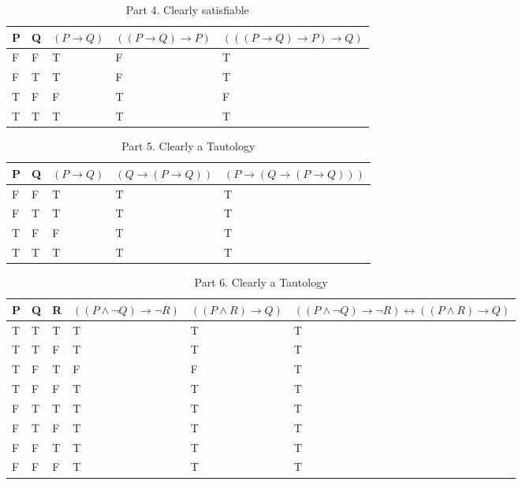 \documentclass[10.5pt]{article}
\newenvironment{solution}[2][Solution]{ \begin{trivlist}
\item[\hskip \labelsep {\bfseries #1}]}{\end{trivlist}}
\begin{document}
\begin{solution}{2}
\begin{table}[!h]
\centering
\caption{Part 4. Clearly satisfiable}
\label{my-label}
\begin{tabular}{|l|l|l|l|l|}
\hline
P & Q & $(P \rightarrow Q)$ & $((P \rightarrow Q) \rightarrow P)$ & $(((P \rightarrow Q) \rightarrow P) \rightarrow Q)$ \\ \hline
F & F & T & F & T \\ \hline
F & T & T & F & T \\ \hline
T & F & F & T & F \\ \hline
T & T & T & T & T \\ \hline
\end{tabular}
\end{table}

\begin{table}[!h]
\centering
\caption{Part 5. Clearly a Tautology}
\label{my-label}
\begin{tabular}{|l|l|l|l|l|}
\hline
P & Q & $(P \rightarrow Q)$ & $(Q \rightarrow (P \rightarrow Q))$ & $(P \rightarrow (Q \rightarrow (P \rightarrow Q)))$ \\ \hline
F & F & T & T & T \\ \hline
F & T & T & T & T \\ \hline
T & F & F & T & T \\ \hline
T & T & T & T & T \\ \hline
\end{tabular}
\end{table}

\begin{table}[!h]
\centering
\caption{Part 6. Clearly a Tautology}
\label{my-label}
\begin{tabular}{|l|l|l|l|l|l|}
\hline
P & Q & R & $((P \wedge \lnot Q) \rightarrow \lnot R)$ & $((P \wedge R) \rightarrow Q)$ & $((P \wedge \lnot Q) \rightarrow \lnot R) \leftrightarrow ((P \wedge R) \rightarrow Q)$ \\ \hline
T & T & T & T & T & T \\ \hline
T & T & F & T & T & T \\ \hline
T & F & T & F & F & T \\ \hline
T & F & F & T & T & T \\ \hline
F & T & T & T & T & T \\ \hline
F & T & F & T & T & T \\ \hline
F & F & T & T & T & T \\ \hline
F & F & F & T & T & T \\ \hline
\end{tabular}
\end{table}


\end{solution}
\end{document}
